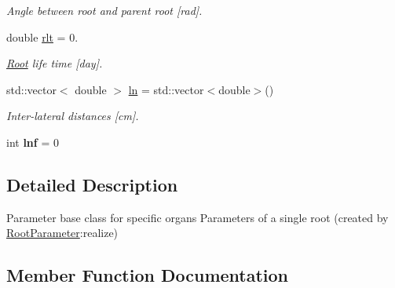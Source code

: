\begin{DoxyCompactItemize}
\begin{DoxyCompactList}\small\item\em Angle between root and parent root \mbox{[}rad\mbox{]}. \end{DoxyCompactList}\item 
\mbox{\label{classCPlantBox_1_1LeafParameter_afece895e2e0669022f3813e9bd4263c6}} 
double \hyperlink{classCPlantBox_1_1LeafParameter_afece895e2e0669022f3813e9bd4263c6}{rlt} = 0.
\begin{DoxyCompactList}\small\item\em \hyperlink{classCPlantBox_1_1Root}{Root} life time \mbox{[}day\mbox{]}. \end{DoxyCompactList}\item 
\mbox{\label{classCPlantBox_1_1LeafParameter_aeafebf5e63919a27d47f31dc09afddc8}} 
std\+::vector$<$ double $>$ \hyperlink{classCPlantBox_1_1LeafParameter_aeafebf5e63919a27d47f31dc09afddc8}{ln} = std\+::vector$<$double$>$()
\begin{DoxyCompactList}\small\item\em Inter-\/lateral distances \mbox{[}cm\mbox{]}. \end{DoxyCompactList}\item 
\mbox{\label{classCPlantBox_1_1LeafParameter_a50ade6d628cf02832df79f1c856988a2}} 
int {\bfseries lnf} = 0
\end{DoxyCompactItemize}


\subsection{Detailed Description}
Parameter base class for specific organs Parameters of a single root (created by \hyperlink{classCPlantBox_1_1RootParameter}{Root\+Parameter}\+:realize) 

\subsection{Member Function Documentation}
\mbox{\label{classCPlantBox_1_1LeafParameter_a5a14e0f70c9e00cdcafd4fb86b6ef0ca}} 
